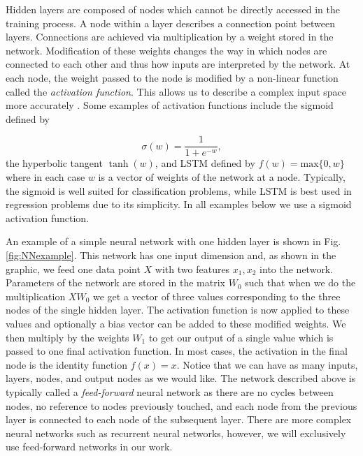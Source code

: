 \documentclass{CUP-JNL-DTM}%
\theoremstyle{definition}
\numberwithin{equation}{section}
\newcommand{\Define}{\emph}
\begin{document}
Hidden layers are composed of nodes which cannot be directly accessed in the training process. A node within a layer describes a connection point between layers. Connections are achieved via multiplication by a weight stored in the network. Modification of these weights changes the way in which nodes are connected to each other and thus how inputs are interpreted by the network. At each node, the weight passed to the node is modified by a non-linear function called the \Define{activation function}. This allows us to describe a complex input space more accurately \cite{dubeyActivationFunctionsDeep2022a}. Some examples of activation functions include the sigmoid defined by 

\begin{equation}
    \sigma(w) = \frac{1}{1 + e^{-w}},
\end{equation}
the hyperbolic tangent $\tanh(w)$, and LSTM defined by $f(w) = \textrm{max}\{0,w\}$ where in each case $w$ is a vector of weights of the network at a node. Typically, the sigmoid is well suited for classification problems, while LSTM is best used in regression problems due to its simplicity. In all examples below we use a sigmoid activation function. 

An example of a simple neural network with one hidden layer is shown in Fig. \ref{fig:NNexample}. This network has one input dimension and, as shown in the graphic, we feed one data point $X$ with two features $x_1, x_2$ into the network. Parameters of the network are stored in the matrix $W_0$ such that when we do the multiplication $X W_0$ we get a vector of three values corresponding to the three nodes of the single hidden layer. The activation function is now applied to these values and optionally a bias vector can be added to these modified weights. We then multiply by the weights $W_1$ to get our output of a single value which is passed to one final activation function. In most cases, the activation in the final node is the identity function $f(x) = x$. Notice that we can have as many inputs, layers, nodes, and output nodes as we would like. The network described above is typically called a \Define{feed-forward} neural network as there are no cycles between nodes, no reference to nodes previously touched, and each node from the previous layer is connected to each node of the subsequent layer. There are more complex neural networks such as recurrent neural networks, however, we will exclusively use feed-forward networks in our work.
\end{document}
